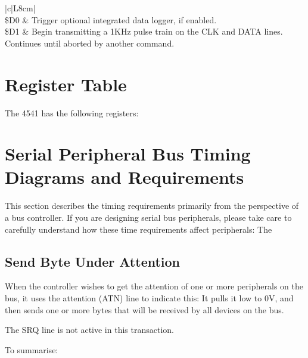 \begin{center}
\begin{longtable}{|c|L{8cm}|}
         \\
        \hline
        \$D0 & Trigger optional integrated data logger, if enabled. \\
        \hline
        \$D1 & Begin transmitting a 1KHz pulse train on the CLK and
        DATA lines. Continues until aborted by another command. \\
        \hline
    \end{longtable}
\end{center}


\section{Register Table}

The 4541 has the following registers:



\section{Serial Peripheral Bus Timing Diagrams and Requirements}

This section describes the timing requirements primarily from the
perspective of a bus controller. If you are designing serial bus
peripherals, please take care to carefully understand how these time
requirements affect peripherals: The 


\subsection{Send Byte Under Attention}

When the controller wishes to get the attention of one or more
peripherals on the bus, it uses the attention (ATN) line to indicate
this: It pulls it low to 0V, and then sends one or more bytes that
will be received by all devices on the bus.

The SRQ line is not active in this transaction.

To summarise:

